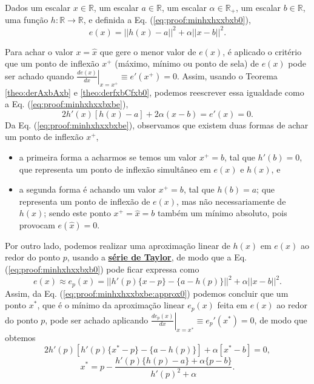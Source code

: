 \begin{myproofT}\label{proof:theo:minhxhxxbxb}

Dados
um escalar $x \in \mathbb{R}$, 
um escalar $a \in \mathbb{R}$,
um escalar $\alpha \in \mathbb{R}_{+}$,
um escalar $b \in \mathbb{R}$,
uma função $h:\mathbb{R} \rightarrow \mathbb{R}$, e 
definida a Eq. (\ref{eq:proof:minhxhxxbxb0}),
\begin{equation}\label{eq:proof:minhxhxxbxb0}
e(x)=||h(x)-a||^2+\alpha ||x-b||^2.
\end{equation}

Para achar o valor  $x=\hat{x}$ que gere o menor valor de $e(x)$, é aplicado
o critério que um ponto de inflexão $x^+$ (máximo, mínimo ou ponto de sela) de $e(x)$ 
pode ser achado quando 
$\left. \frac{d e(x)}{d x }\right|_{x=x^+} \equiv e'(x^+) =0$.
Assim, 
usando o Teorema \ref{theo:derAxbAxb} e \ref{theo:derfxbCfxb0}, podemos 
reescrever essa igualdade como a Eq. (\ref{eq:proof:minhxhxxbxbe}),
\begin{equation}\label{eq:proof:minhxhxxbxbe}
2  h'(x) \left[h(x) -a\right]+2\alpha (x-b)= e'(x)=0.
\end{equation}
Da Eq. (\ref{eq:proof:minhxhxxbxbe}), observamos 
que existem duas formas de achar um ponto de inflexão $x^+$,
\begin{itemize}
 \item a primeira forma a acharmos se temos um valor $x^+=b$, tal que $h'(b)=0$, 
que representa um ponto de inflexão simultâneo em $e(x)$ e $h(x)$, e
 \item a segunda forma é achando um valor $x^+=b$, tal que $h(b)=a$;
que representa um ponto de inflexão de $e(x)$, mas não
necessariamente de $h(x)$; 
sendo este ponto $x^+=\hat{x}=b$ também um mínimo absoluto, pois provocam $e(\hat{x})=0$.
\end{itemize}

Por outro lado, podemos realizar uma aproximação linear de $h(x)$ em $e(x)$
ao redor do ponto $p$, usando a \hyperref[def:taylor]{\textbf{série de Taylor}},
de modo que a Eq. (\ref{eq:proof:minhxhxxbxb0}) pode ficar expressa como
\begin{equation}\label{eq:proof:minhxhxxbxbe:approx0}
e(x) \approx  e_p(x) = ||h'(p)\{x-p\}-\{a-h(p)\}||^2+\alpha ||x-b||^2.
\end{equation}
Assim, da Eq. (\ref{eq:proof:minhxhxxbxbe:approx0})
podemos concluir que um ponto $x^*$, que é 
o mínimo da aproximação linear $e_p(x)$ feita em $e(x)$ ao redor do ponto $p$,
pode ser achado aplicando $\left. \frac{d e_p(x)}{d x }\right|_{x=x^*} \equiv e_{p}'(x^*) =0$,
de modo que obtemos
\begin{equation}\label{eq:proof:minhxhxaxb2a}
 2 h'(p)[h'(p)\{x^*-p\} -\{a-h(p)\}] + \alpha [x^*-b] = 0,
\end{equation} 
\begin{equation}\label{eq:proof:minhxhxaxb2}
x^* = p - \frac{h'(p)\{h(p)-a\}+\alpha\{p-b\}}{ h'(p)^2+\alpha}.
\end{equation} 


\end{myproofT}
